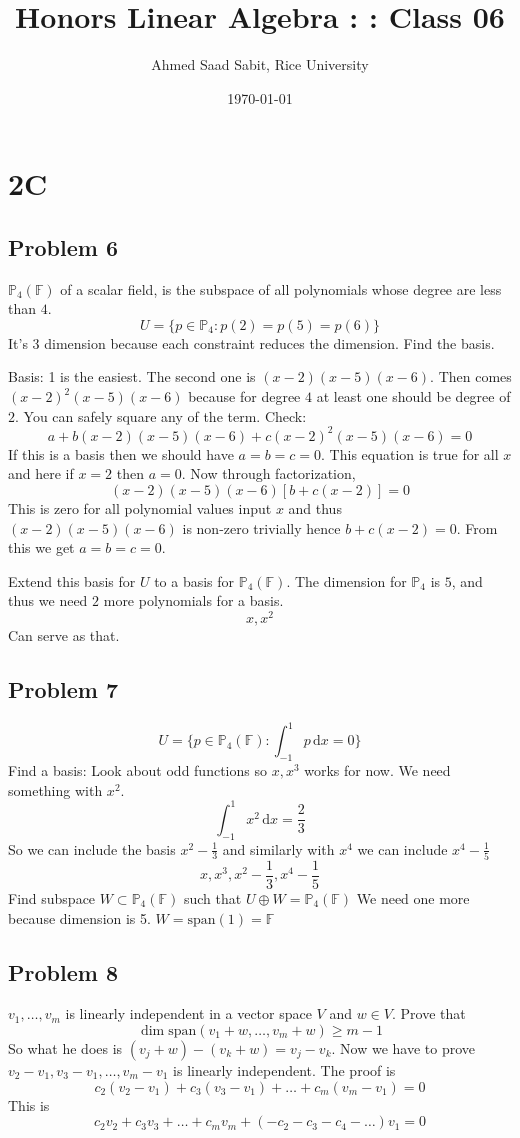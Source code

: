 \documentclass[letter]{article}
\title{Honors Linear Algebra : : Class 06}
\author{Ahmed Saad Sabit, Rice University}
\date{\today}
\begin{document}
	\maketitle 
	\section{2C}
	\subsection{Problem 6} 

$\mathbb{P}_4(\mathbb{F})$ of a scalar field, is the subspace of all polynomials whose degree are less than $4$. 
\[
U = \{p \in  \mathbb{P}_4 : p(2) = p(5) = p(6)\} 
\]
It's $3$ dimension because each constraint reduces the dimension. Find the basis. 

Basis: 1 is the easiest. The second one is $(x-2)(x-5)(x-6)$. Then comes $(x-2)^2(x-5)(x-6)$ because for degree $4$ at least one should be degree of $2$. You can safely square any of the term. 
Check:
\[
a + b(x-2)(x-5)(x-6)+c(x-2)^2(x-5)(x-6) = 0
\]
If this is a basis then we should have $a=b=c = 0$. This equation is true for all $x$ and here if $x=2$ then $a=0$. Now through factorization,
\[
	(x-2)(x-5)(x-6) [b+ c(x-2) ] = 0
\]
This is zero for all polynomial values input $x$ and thus $(x-2)(x-5)(x-6)$ is non-zero trivially hence $b+c(x-2)=0$. From this we get $a=b=c=0$. 

Extend this basis for $U$ to a basis for $\mathbb{P}_4(\mathbb{F})$. The dimension for $\mathbb{P}_4$ is $5$, and thus we need $2$ more polynomials for a basis. 
\[
x, x^2
\] Can serve as that. 

	\subsection{Problem 7}
\[
	U = \{p \in \mathbb{P}_4(\mathbb{F}) : \int_{-1}^{1} p\, \mathrm{d} x = 0\}
\] 
Find a basis: Look about odd functions so  $x,x^3$ works for now. We need something with $x^2$.
\[
	\int_{-1}^1 x^2\, \mathrm{d} x = \frac{2}{3}
\] 
So we can include the basis $x^2 - \frac{1}{3}$ and similarly with $x^{4}$ we can include $x^{4} - \frac{1}{5}$ 
\[
x, x^3, x^2 -\frac{1}{3}, x^{4} - \frac{1}{5}
\] 
Find subspace $W \subset \mathbb{P}_4(\mathbb{F})$ such that $U \oplus W = \mathbb{P}_4(\mathbb{F})$ We need one more because dimension is 5. $W = \text{span}(1) = \mathbb{F}$


	\subsection{Problem 8} 
$v_1, \ldots, v_m$ is linearly independent in a vector space $V$ and $w \in V$. Prove that 
\[
\dim \text{span}(v_1+w, \ldots, v_m + w) \ge m-1 
\]
So what he does is 
$(v_j + w) - (v_k + w) = v_j - v_k$. Now we have to prove $v_2-v_1, v_3-v_1, \ldots, v_m - v_1$ is linearly independent. 
The proof is \[c_2(v_2-v_1) + c_3(v_3-v_1)+ \ldots + c_m(v_m - v_1) = 0\]
This is \[c_2 v_2 + c_3 v_3 + \ldots + c_m v_m + (-c_2-c_3-c_4-\ldots)v_1 = 0\]
\end{document}
